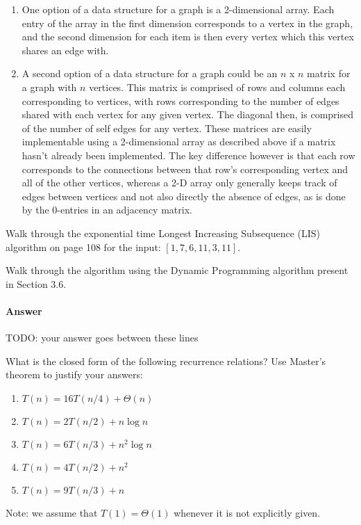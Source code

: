 \documentclass{article}
\begin{document}

\begin{enumerate}
	\item
		One option of a data structure for a graph is a 2-dimensional array. Each entry of the array in the first
		dimension corresponds to a vertex in the graph, and the second dimension for each item is then every vertex
		which this vertex shares an edge with.
	\item
		A second option of a data structure for a graph could be an $n$ x $n$ matrix for a graph with $n$ vertices.
		This matrix is comprised of rows and columns each corresponding to vertices, with rows corresponding to the
		number of edges shared with each vertex for any given vertex. The diagonal then, is comprised of the number
		of self edges for any vertex. These matrices are easily implementable using a 2-dimensional array as
		described above if a matrix hasn't already been implemented. The key difference however is that each row
		corresponds to the connections between that row's corresponding vertex and all of the other vertices, whereas
		a 2-D array only generally keeps track of edges between vertices and not also directly the absence of edges,
		as is done by the 0-entries in an adjacency matrix.
\end{enumerate}



\nextprob
{}

Walk through the exponential time Longest Increasing Subsequence (LIS) algorithm
on page 108 for the input: $\left[ 1, 7, 6, 11, 3, 11 \right]$.

Walk through the algorithm using the Dynamic Programming algorithm present in
Section 3.6.

\paragraph{Answer}


TODO: your answer goes between these lines


\nextprob
{}

What is the closed form of the following recurrence relations?  Use Master's
theorem to justify your answers:
\begin{enumerate}
    \item $T(n) = 16 T(n/4) + \Theta(n)$
    \item $T(n) = 2 T(n/2) + n \log{n}$
    \item $T(n) = 6 T(n/3) + n^2 \log{n}$
    \item $T(n) = 4 T(n/2) + n^2$
    \item $T(n) = 9 T(n/3) + n$
\end{enumerate}
Note: we assume that $T(1)=\Theta(1)$ whenever it is not explicitly given.
\end{document}
